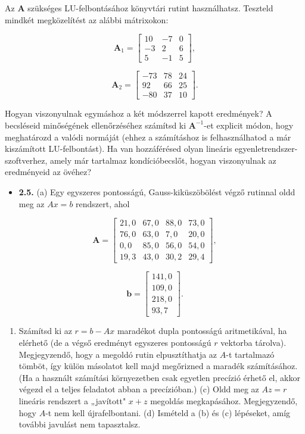 \documentclass[
  magyar,
  11pt]{article}
\providecommand{\tightlist}{%
  \setlength{\itemsep}{0pt}\setlength{\parskip}{0pt}}
\providecommand{\boldsymbol}[1]{\mathbf{#1}}
\begin{document}
Az \(\boldsymbol{A}\) szükséges LU-felbontásához könyvtári rutint
használhatsz. Teszteld mindkét megközelítést az alábbi mátrixokon:

\[\mathbf{A}_1 = \begin{bmatrix} 10 & -7 & 0 \\ -3 & 2 & 6 \\ 5 & -1 & 5 \end{bmatrix},\]

\[\mathbf{A}_2 = \begin{bmatrix} -73 & 78 & 24 \\ 92 & 66 & 25 \\ -80 & 37 & 10 \end{bmatrix}.\]

Hogyan viszonyulnak egymáshoz a két módszerrel kapott eredmények? A
becsléseid minőségének ellenőrzéséhez számítsd ki \(\mathbf{A}^{-1}\)-et
explicit módon, hogy meghatározd a valódi normáját (ehhez a számításhoz
is felhasználhatod a már kiszámított LU-felbontást). Ha van hozzáférésed
olyan lineáris egyenletrendszer-szoftverhez, amely már tartalmaz
kondícióbecslőt, hogyan viszonyulnak az eredményeid az övéhez?

\begin{itemize}
\tightlist
\item
  \textbf{2.5.} (a) Egy egyszeres pontosságú, Gauss-kiküszöbölést végző
  rutinnal oldd meg az \(Ax = b\) rendszert, ahol
\end{itemize}

\[\boldsymbol{A} = \begin{bmatrix} 21{,}0 & 67{,}0 & 88{,}0 & 73{,}0 \\ 76{,}0 & 63{,}0 & 7{,}0 & 20{,}0 \\ 0{,}0 & 85{,}0 & 56{,}0 & 54{,}0 \\ 19{,}3 & 43{,}0 & 30{,}2 & 29{,}4 \end{bmatrix},\]

\[\boldsymbol{b} = \begin{bmatrix} 141{,}0 \\ 109{,}0 \\ 218{,}0 \\ 93{,}7 \end{bmatrix}.\]

\begin{enumerate}
\def\labelenumi{(\alph{enumi})}
\setcounter{enumi}{1}
\tightlist
\item
  Számítsd ki az \(r = b - Ax\) maradékot dupla pontosságú
  aritmetikával, ha elérhető (de a végső eredményt egyszeres pontosságú
  \(r\) vektorba tárolva). Megjegyzendő, hogy a megoldó rutin
  elpusztíthatja az \(A\)-t tartalmazó tömböt, így külön másolatot kell
  majd megőrizned a maradék számításához. (Ha a használt számítási
  környezetben csak egyetlen precízió érhető el, akkor végezd el a
  teljes feladatot abban a precízióban.) (c) Oldd meg az \(Az = r\)
  lineáris rendszert a „javított" \(x + z\) megoldás megkapásához.
  Megjegyzendő, hogy \(A\)-t nem kell újrafelbontani. (d) Ismételd a (b)
  és (c) lépéseket, amíg további javulást nem tapasztalsz.
\end{enumerate}
\end{document}
